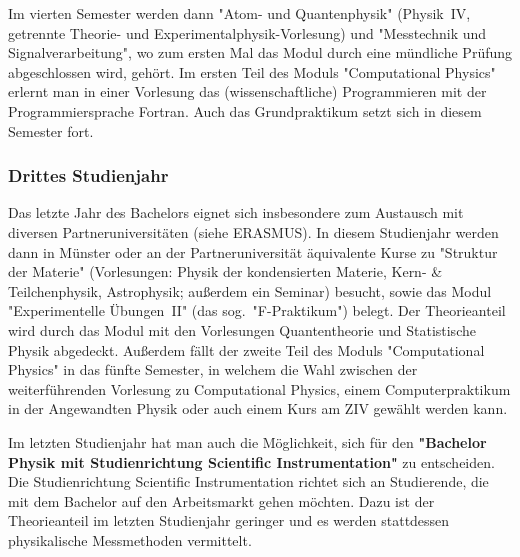 \begin{multicols}{2}
Im vierten Semester werden dann "Atom- und Quantenphysik" (Physik~IV, getrennte Theorie- und Experimentalphysik-Vorlesung) und "Messtechnik und Signalverarbeitung", wo zum ersten Mal das Modul durch eine mündliche Prüfung abgeschlossen wird, gehört. Im ersten Teil des Moduls "Computational Physics" erlernt man in einer Vorlesung das (wissenschaftliche) Programmieren mit der Programmiersprache Fortran. Auch das Grundpraktikum setzt sich in diesem Semester fort.

\subsubsection*{Drittes Studienjahr}
Das letzte Jahr des Bachelors eignet sich insbesondere zum Austausch mit diversen Partneruniversitäten (siehe ERASMUS). In diesem Studienjahr werden dann in Münster oder an der Partneruniversität äquivalente Kurse zu "Struktur der Materie" (Vorlesungen: Physik der kondensierten Materie, Kern- \& Teilchenphysik, Astrophysik; außerdem ein Seminar) besucht, sowie das Modul "Experimentelle Übungen~II" (das sog.\ "F-Praktikum") belegt. Der Theorieanteil wird durch das Modul mit den Vorlesungen Quantentheorie und Statistische Physik abgedeckt. Außerdem fällt der zweite Teil des Moduls "Computational Physics" in das fünfte Semester, in welchem die Wahl zwischen der weiterführenden Vorlesung zu Computational Physics, einem Computerpraktikum in der Angewandten Physik oder auch einem Kurs am ZIV gewählt werden kann.

Im letzten Studienjahr hat man auch die Möglichkeit, sich für den \textbf{"Bachelor Physik mit Studienrichtung Scientific Instrumentation"} zu entscheiden. Die Studienrichtung Scientific Instrumentation richtet sich an Studierende, die mit dem Bachelor auf den Arbeitsmarkt gehen möchten. Dazu ist der Theorieanteil im letzten Studienjahr geringer und es werden stattdessen physikalische Messmethoden vermittelt.


\end{multicols}
